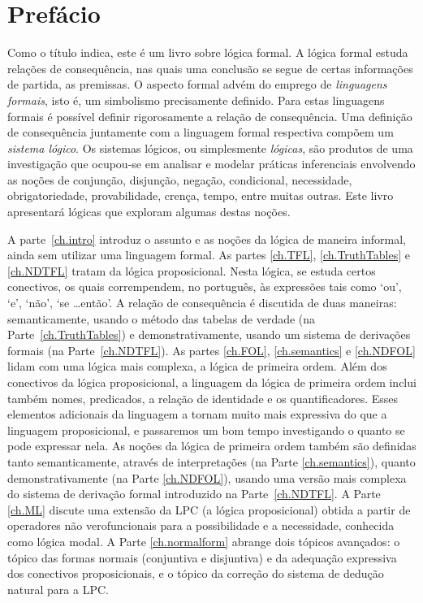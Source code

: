 \chapter{Prefácio}

Como o título indica, este é um livro sobre lógica formal.
A lógica formal estuda relações de consequência, nas quais uma conclusão se segue de certas informações de partida, as premissas.
O aspecto formal advém do emprego de \emph{linguagens formais}, isto é, um simbolismo precisamente definido.
Para estas linguagens formais é possível definir rigorosamente a relação de consequência.
Uma definição de consequência juntamente com a linguagem formal respectiva compõem um \emph{sistema lógico}.
Os sistemas lógicos, ou simplesmente \emph{lógicas}, são produtos de uma investigação que ocupou-se em analisar e modelar práticas inferenciais envolvendo as noções de conjunção, disjunção, negação, condicional, necessidade, obrigatoriedade, provabilidade, crença, tempo, entre muitas outras.
Este livro apresentará lógicas que exploram algumas destas noções.


A parte~\ref{ch.intro} introduz o assunto e as noções da lógica de maneira informal, ainda sem utilizar uma linguagem formal.
As partes \ref{ch.TFL}, \ref{ch.TruthTables} e \ref{ch.NDTFL} tratam da lógica proposicional.  Nesta lógica,  se estuda certos conectivos, os quais corrempendem, no português, às expressões tais como `ou', `e', `não', `se \dots então'.
A relação de consequência é discutida de duas maneiras:
semanticamente, usando o método das tabelas de verdade (na Parte~\ref{ch.TruthTables}) e demonstrativamente, usando um sistema de derivações formais (na Parte~\ref{ch.NDTFL}).
As partes \ref{ch.FOL}, \ref{ch.semantics} e \ref{ch.NDFOL} lidam com uma lógica mais complexa, a lógica de primeira ordem.
Além dos conectivos da lógica proposicional, a linguagem da lógica de primeira ordem inclui também nomes, predicados, a relação de identidade e os quantificadores.
Esses elementos adicionais da linguagem a tornam muito mais expressiva do que a linguagem proposicional, e passaremos um bom tempo investigando o quanto se pode expressar nela.
As noções da lógica de primeira ordem também são definidas tanto semanticamente, através de interpretações (na Parte \ref{ch.semantics}), quanto demonstrativamente (na Parte \ref{ch.NDFOL}), usando uma versão mais complexa do sistema de derivação formal introduzido na Parte~\ref{ch.NDTFL}.
A Parte \ref{ch.ML} discute uma extensão da LPC (a lógica proposicional) obtida a partir de operadores não verofuncionais para a possibilidade e a necessidade, conhecida como lógica modal.
A Parte \ref{ch.normalform} abrange dois tópicos avançados:
o tópico das formas normais (conjuntiva e disjuntiva) e da adequação expressiva dos conectivos proposicionais, e o tópico da correção do sistema de dedução natural para a LPC.

